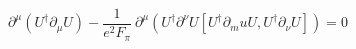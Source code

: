 \begin{equation}
\partial^\mu(U^\dag\partial_\mu U) -\frac{1}{e^2 F_\pi}~ \partial^\mu (U^\dag  \partial^\nu U [ U^\dag \partial_mu U , U^\dag \partial_\nu U])=0
\end{equation}


